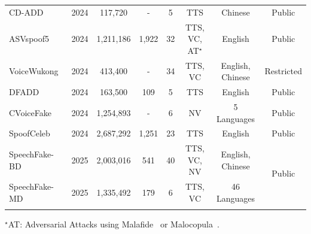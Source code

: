 {\begin{tabular}{l||c|c|c|c|c|c|c}
    CD-ADD~\cite{li2024cross} & 2024 & 117,720 & - & 5 & TTS & Chinese & Public \\ %
    ASVspoof5~\cite{wang2024asvspoof} & 2024 & 1,211,186 & 1,922 & 32 & TTS, VC, AT$^\star$ & English & Public \\ %
    VoiceWukong~\cite{yan2024voicewukong} & 2024 & 413,400 & - & 34 & TTS, VC & English, Chinese & Restricted \\ %
    DFADD~\cite{du2024dfadd} & 2024 & 163,500 & 109 & 5 & TTS & English & Public \\
    CVoiceFake~\cite{li2024safeear} & 2024 & 1,254,893 & - & 6 & NV & 5 Languages & Public \\
    SpoofCeleb~\cite{jung2025spoofceleb} & 2024 & 2,687,292 & 1,251 & 23 & TTS & English & Public \\
    \hline
    SpeechFake-BD & 2025 & 2,003,016 & 541 & 40 & TTS, VC, NV & English, Chinese & \multirow{2}{*}{Public} \\
    SpeechFake-MD & 2025 & 1,335,492 & 179 & 6 & TTS, VC &  46 Languages &  \\
    \Xhline{1pt}
    \end{tabular}}
    \begin{tablenotes}
    \item\scriptsize $^\star$AT: Adversarial Attacks using Malafide~\cite{panariello2023malafide} or Malocopula~\cite{todisco2024malacopula}.
    \end{tablenotes}







